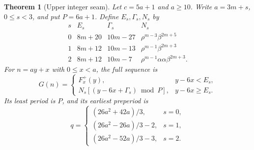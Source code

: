 \documentclass[11pt]{article}
\newtheorem{theorem}{Theorem}[section]
\theoremstyle{remark}\newtheorem{remark}[theorem]{Remark}
\begin{document}
\begin{theorem}[Upper integer seam]\label{thm:upper-seam}
Let $c=5a+1$ and $a\ge10$.  Write $a=3m+s$, $0\le s<3$, and
put $P=6a+1$.  Define $E_s,\Gamma_s,N_s$ by
\[
\begin{array}{c|c|c|l}
s&E_s&\Gamma_s&N_s\\\hline
0&8m+20&10m-27&\rho^{m-3}\beta^{2m+5}\\
1&8m+12&10m-13&\rho^{m-1}\beta^{2m+3}\\
2&8m+12&10m-7&\rho^{m-1}\alpha\alpha\beta^{2m+3}.
\end{array}
\]
For $n=ay+x$ with $0\le x<a$, the full sequence is
\begin{equation}\label{eq:upper-seam-full}
 G(n)=
 \begin{cases}
 F_x^+(y),&y-6x<E_s,\\
 N_s[(y-6x+\Gamma_s)\bmod P],&y-6x\ge E_s.
 \end{cases}
\end{equation}
Its least period is $P$, and its earliest preperiod is
\begin{equation}\label{eq:upper-seam-q}
 q=
 \begin{cases}
 (26a^2+42a)/3,&s=0,\\
 (26a^2-26a)/3-2,&s=1,\\
 (26a^2-52a)/3-3,&s=2.
 \end{cases}
\end{equation}
\end{theorem}
\end{document}
